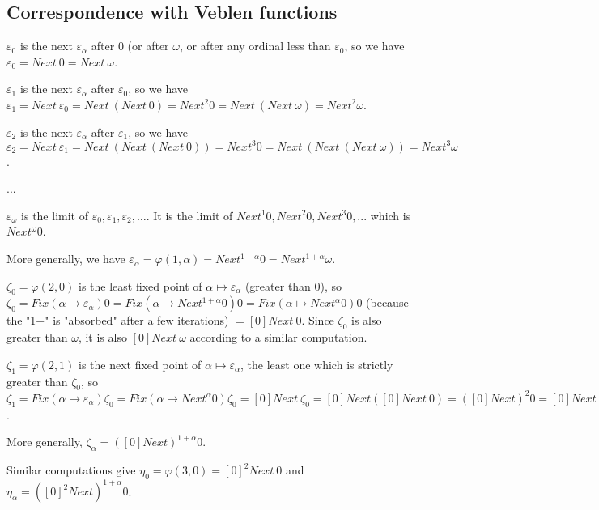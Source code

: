 \documentclass[10pt]{article}
\begin{document}
\subsection{Correspondence with Veblen functions}

\( \varepsilon_0 \) is the next \( \varepsilon_\alpha \) after 0 (or after \( \omega \), or after any ordinal less than \( \varepsilon_0 \), so we have \( \varepsilon_0 = Next\ 0 = Next\ \omega \).

\( \varepsilon_1 \) is the next \( \varepsilon_\alpha \) after \( \varepsilon_0 \), so we have \( \varepsilon_1 = Next\ \varepsilon_0 = Next\ (Next\ 0) = Next^2 0 = Next\ (Next\ \omega) = Next^2 \omega \).

\( \varepsilon_2 \) is the next \( \varepsilon_\alpha \) after \( \varepsilon_1 \), so we have \( \varepsilon_2 = Next\ \varepsilon_1 = Next\ (Next\ (Next\ 0)) = Next^3 0 = Next\ (Next\ (Next\ \omega)) = Next^3 \omega \).

...

\( \varepsilon_\omega \) is the limit of \( \varepsilon_0, \varepsilon_1, \varepsilon_2, \ldots \). It is the limit of \( Next^1 0, Next^2 0, Next^3 0, ... \) which is \( Next^\omega 0 \).

More generally, we have \( \varepsilon_\alpha = \varphi(1,\alpha) = Next^{1+\alpha} 0 = Next^{1+\alpha} \omega \).

\bigskip

\( \zeta_0 = \varphi(2,0) \) is the least fixed point of \( \alpha \mapsto \varepsilon_\alpha \) (greater than 0), so \( \zeta_0 = Fix (\alpha \mapsto \varepsilon_\alpha) 0 = Fix (\alpha \mapsto Next^{1+\alpha} 0) 0 = Fix (\alpha \mapsto Next^\alpha 0) 0 \) (because the "1+" is "absorbed" after a few iterations) \( = [0] Next\ 0 \). Since \( \zeta_0 \) is also greater than \( \omega \), it is also \( [0] Next\ \omega \) according to a similar computation. 

\( \zeta_1 = \varphi(2,1) \) is the next fixed point of \( \alpha \mapsto \varepsilon_\alpha \), the least one which is strictly greater than \( \zeta_0 \), so \( \zeta_1 = Fix (\alpha \mapsto \varepsilon_\alpha) \zeta_0 = Fix (\alpha \mapsto Next^\alpha 0) \zeta_0 = [0] Next\ \zeta_0 = [0] Next ([0] Next\ 0) = ([0] Next)^2 0 = [0] Next ([0] Next\ \omega) = ([0] Next)^2 \omega \).

More generally, \( \zeta_\alpha = ([0] Next)^{1+\alpha} 0 \).

Similar computations give \( \eta_0 = \varphi(3,0) = [0]^2 Next\ 0 \) and \( \eta_\alpha = ([0]^2 Next)^{1+\alpha} 0 \).
\end{document}
